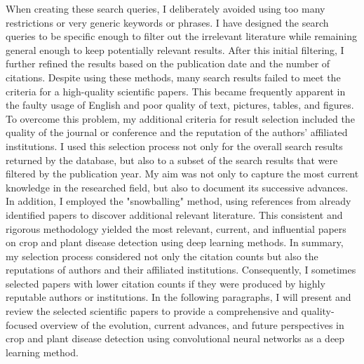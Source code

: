 \documentclass{BachelorBUI}
\begin{document}
When creating these search queries, I deliberately avoided using too many restrictions or very generic keywords or phrases. I have designed the search queries to be specific enough to filter out the irrelevant literature while remaining general enough to keep potentially relevant results. After this initial filtering, I further refined the results based on the publication date and the number of citations. Despite using these methods, many search results failed to meet the criteria for a high-quality scientific papers. This became frequently apparent in the faulty usage of English and poor quality of text, pictures, tables, and figures. To overcome this problem, my additional criteria for result selection included the quality of the journal or conference and the reputation of the authors' affiliated institutions. I used this selection process not only for the overall search results returned by the database, but also to a subset of the search results that were filtered by the publication year. My aim was not only to capture the most current knowledge in the researched field, but also to document its successive advances. In addition, I employed the "snowballing" method, using references from already identified papers to discover additional relevant literature. This consistent and rigorous methodology yielded the most relevant, current, and influential papers on crop and plant disease detection using deep learning methods. In summary, my selection process considered not only the citation counts but also the reputations of authors and their affiliated institutions. Consequently, I sometimes selected papers with lower citation counts if they were produced by highly reputable authors or institutions. In the following paragraphs, I will present and review the selected scientific papers to provide a comprehensive and quality-focused overview of the evolution, current advances, and future perspectives in crop and plant disease detection using convolutional neural networks as a deep learning method.
\end{document}
